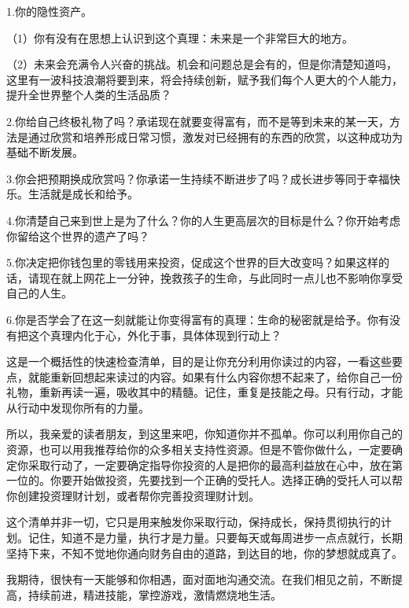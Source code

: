 1.你的隐性资产。

（1）你有没有在思想上认识到这个真理：未来是一个非常巨大的地方。

（2）未来会充满令人兴奋的挑战。机会和问题总是会有的，但是你清楚知道吗，这里有一波科技浪潮将要到来，将会持续创新，赋予我们每个人更大的个人能力，提升全世界整个人类的生活品质？

2.你给自己终极礼物了吗？承诺现在就要变得富有，而不是等到未来的某一天，方法是通过欣赏和培养形成日常习惯，激发对已经拥有的东西的欣赏，以这种成功为基础不断发展。

3.你会把预期换成欣赏吗？你承诺一生持续不断进步了吗？成长进步等同于幸福快乐。生活就是成长和给予。

4.你清楚自己来到世上是为了什么？你的人生更高层次的目标是什么？你开始考虑你留给这个世界的遗产了吗？

5.你决定把你钱包里的零钱用来投资，促成这个世界的巨大改变吗？如果这样的话，请现在就上网花上一分钟，挽救孩子的生命，与此同时一点儿也不影响你享受自己的人生。

6.你是否学会了在这一刻就能让你变得富有的真理：生命的秘密就是给予。你有没有把这个真理内化于心，外化于事，具体体现到行动上？

这是一个概括性的快速检查清单，目的是让你充分利用你读过的内容，一看这些要点，就能重新回想起来读过的内容。如果有什么内容你想不起来了，给你自己一份礼物，重新再读一遍，吸收其中的精髓。记住，重复是技能之母。只有行动，才能从行动中发现你所有的力量。

所以，我亲爱的读者朋友，到这里来吧，你知道你并不孤单。你可以利用你自己的资源，也可以用我推荐给你的众多相关支持性资源。但是不管你做什么，一定要确定你采取行动了，一定要确定指导你投资的人是把你的最高利益放在心中，放在第一位的。你要开始做投资，先要找到一个正确的受托人。选择正确的受托人可以帮你创建投资理财计划，或者帮你完善投资理财计划。

这个清单并非一切，它只是用来触发你采取行动，保持成长，保持贯彻执行的计划。记住，知道不是力量，执行才是力量。只要每天或每周进步一点点就行，长期坚持下来，不知不觉地你通向财务自由的道路，到达目的地，你的梦想就成真了。

我期待，很快有一天能够和你相遇，面对面地沟通交流。在我们相见之前，不断提高，持续前进，精进技能，掌控游戏，激情燃烧地生活。
